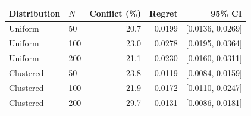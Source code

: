 \begin{tabular}{llrrr}
\toprule
Distribution & $N$ & Conflict (\%) & Regret & 95\% CI \\
\midrule
Uniform & 50 & 20.7 & 0.0199 & [0.0136, 0.0269] \\
Uniform & 100 & 23.0 & 0.0278 & [0.0195, 0.0364] \\
Uniform & 200 & 21.1 & 0.0230 & [0.0160, 0.0311] \\
Clustered & 50 & 23.8 & 0.0119 & [0.0084, 0.0159] \\
Clustered & 100 & 21.9 & 0.0172 & [0.0110, 0.0247] \\
Clustered & 200 & 29.7 & 0.0131 & [0.0086, 0.0181] \\
\bottomrule
\end{tabular}
